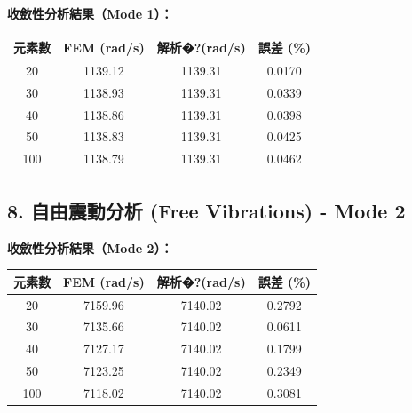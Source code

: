 \documentclass[UTF8, a4paper, 12pt]{ctexart}
\begin{document}
\textbf{收斂性分析結果（Mode 1）：}



\begin{center}

\begin{tabular}{cccc}

\toprule

\textbf{元素數} & \textbf{FEM (rad/s)} & \textbf{解析�?(rad/s)} & \textbf{誤差 (\%)} \\

\midrule

20 & 1139.12 & 1139.31 & 0.0170 \\

30 & 1138.93 & 1139.31 & 0.0339 \\

40 & 1138.86 & 1139.31 & 0.0398 \\

50 & 1138.83 & 1139.31 & 0.0425 \\

100 & 1138.79 & 1139.31 & 0.0462 \\

\bottomrule

\end{tabular}

\end{center}



\subsection{8. 自由震動分析 (Free Vibrations) - Mode 2}



\textbf{收斂性分析結果（Mode 2）：}



\begin{center}

\begin{tabular}{cccc}

\toprule

\textbf{元素數} & \textbf{FEM (rad/s)} & \textbf{解析�?(rad/s)} & \textbf{誤差 (\%)} \\

\midrule

20 & 7159.96 & 7140.02 & 0.2792 \\

30 & 7135.66 & 7140.02 & 0.0611 \\

40 & 7127.17 & 7140.02 & 0.1799 \\

50 & 7123.25 & 7140.02 & 0.2349 \\

100 & 7118.02 & 7140.02 & 0.3081 \\

\bottomrule

\end{tabular}

\end{center}
\end{document}
